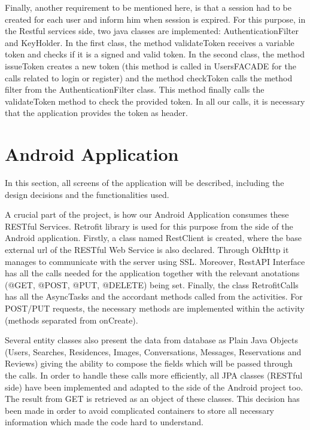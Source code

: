 \documentclass[12pt]{article}
\begin{document}
	Finally, another requirement to be mentioned here, is that a session had to be created for each user and inform him when session is expired. For this purpose, in the Restful services side, two java classes are implemented: AuthenticationFilter and KeyHolder. In the first class, the method validateToken receives a variable token and checks if it is a signed and valid token. In the second class, the method issueToken creates a new token (this method is called in UsersFACADE for the calls related to login or register) and the method checkToken calls the method filter from the AuthenticationFilter class. This method finally calls the validateToken method to check the provided token. In all our calls, it is necessary that the application provides the token as header.
	
	\section{Android Application}
	
	In this section, all screens of the application will be described, including the design decisions and the functionalities used. 
	
	A crucial part of the project, is how our Android Application consumes these RESTful Services. Retrofit library is used for this purpose from the side of the Android application. Firstly, a class named RestClient is created, where the base external url of the RESTful Web Service is also declared. Through OkHttp it manages to communicate with the server using SSL. Moreover, RestAPI Interface has all the calls needed for the application together with the relevant anotations (@GET, @POST, @PUT, @DELETE) being set. Finally, the class RetrofitCalls has all the AsyncTasks and the accordant methods called from the activities. For POST/PUT requests, the necessary methods are implemented within the activity (methods separated from onCreate). 
	
	Several entity classes also present the data from database as Plain Java Objects (Users, Searches, Residences, Images, Conversations, Messages, Reservations and Reviews) giving the ability to compose the fields which will be passed through the calls. In order to handle these calls more efficiently, all JPA classes (RESTful side) have been implemented and adapted to the side of the Android project too. The result from GET is retrieved as an object of these classes. This decision has been made in order to avoid complicated containers to store all necessary information which made the code hard to understand.
	
\end{document}
